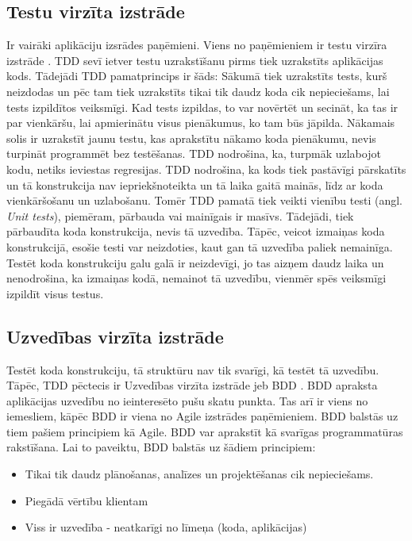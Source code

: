 
\subsection{Testu virzīta izstrāde}
Ir vairāki aplikāciju izsrādes paņēmieni. Viens no paņēmieniem ir testu virzīra izstrāde . TDD sevī ietver testu uzrakstīšanu pirms tiek uzrakstīts aplikācijas kods. Tādejādi TDD pamatprincips ir šāds: Sākumā tiek uzrakstīts tests, kurš neizdodas un pēc tam tiek uzrakstīts tikai tik daudz koda cik nepieciešams, lai tests izpildītos veiksmīgi. Kad tests izpildas, to var novērtēt un secināt, ka tas ir par vienkāršu, lai apmierinātu visus pienākumus, ko tam būs jāpilda. Nākamais solis ir uzrakstīt jaunu testu, kas aprakstītu nākamo koda pienākumu, nevis turpināt programmēt bez testēšanas. TDD nodrošina, ka, turpmāk uzlabojot kodu, netiks ieviestas regresijas. TDD nodrošina, ka kods tiek pastāvīgi pārskatīts un tā konstrukcija nav iepriekšnoteikta un tā laika gaitā mainās, līdz ar koda vienkāršošanu un uzlabošanu.
Tomēr TDD pamatā tiek veikti vienību testi (angl. \textit{Unit tests}), piemēram, pārbauda vai mainīgais ir masīvs. Tādejādi, tiek pārbaudīta koda konstrukcija, nevis tā uzvedība. Tāpēc, veicot izmaiņas koda konstrukcijā, esošie testi var neizdoties, kaut gan tā uzvedība paliek nemainīga. \cite{chelimsky2010Rspec} Testēt koda konstrukciju galu galā ir neizdevīgi, jo tas aizņem daudz laika un nenodrošina, ka izmaiņas kodā, nemainot tā uzvedību, vienmēr spēs veiksmīgi izpildīt visus testus.

\subsection{Uzvedības virzīta izstrāde}
Testēt koda konstrukciju, tā struktūru nav tik svarīgi, kā testēt tā uzvedību. Tāpēc, TDD pēctecis ir Uzvedības virzīta izstrāde jeb BDD . BDD apraksta aplikācijas uzvedību no ieinteresēto pušu skatu punkta. Tas arī ir viens no iemesliem, kāpēc BDD ir viena no Agile izstrādes paņēmieniem. BDD balstās uz tiem pašiem principiem kā Agile.
BDD var aprakstīt kā svarīgas programmatūras rakstīšana. Lai to paveiktu, BDD balstās uz šādiem principiem:
\begin{itemize}
	\item Tikai tik daudz plānošanas, analīzes un projektēšanas cik nepieciešams.
	\item Piegādā vērtību klientam
	\item Viss ir uzvedība - neatkarīgi no līmeņa (koda, aplikācijas)
\end{itemize}
\cite{chelimsky2010Rspec}


